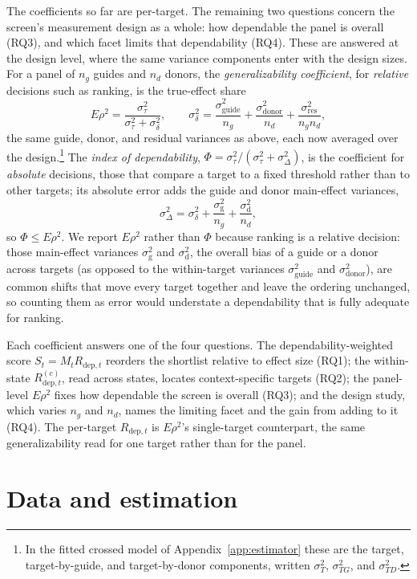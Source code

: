 \documentclass[11pt]{article}
\newcommand{\Rdep}{R_{\mathrm{dep},t}}
\begin{document}
The coefficients so far are per-target. The remaining two questions concern the
screen's measurement design as a whole: how dependable the panel is overall (RQ3),
and which facet limits that dependability (RQ4). These are answered at the design
level, where the same variance components enter with the design sizes. For a panel of
$n_g$ guides and $n_d$ donors, the \emph{generalizability coefficient}, for
\emph{relative} decisions such as ranking, is the true-effect share
\[
E\rho^2 = \frac{\sigma^2_\tau}{\sigma^2_\tau + \sigma^2_\delta}, \qquad
\sigma^2_\delta = \frac{\sigma^2_{\mathrm{guide}}}{n_g}
      + \frac{\sigma^2_{\mathrm{donor}}}{n_d} + \frac{\sigma^2_{\mathrm{res}}}{n_g n_d},
\]
the same guide, donor, and residual variances as above, each now averaged over the
design.\footnote{In the fitted crossed model of Appendix~\ref{app:estimator} these are
the target, target-by-guide, and target-by-donor components, written $\sigma^2_T$,
$\sigma^2_{TG}$, and $\sigma^2_{TD}$.} The \emph{index of dependability},
$\Phi = \sigma^2_\tau/(\sigma^2_\tau + \sigma^2_\Delta)$, is the coefficient for
\emph{absolute} decisions, those that compare a target to a fixed threshold rather than
to other targets; its absolute error adds the guide and donor main-effect variances,
\[
\sigma^2_\Delta = \sigma^2_\delta + \frac{\sigma^2_{\mathrm{g}}}{n_g}
      + \frac{\sigma^2_{\mathrm{d}}}{n_d},
\]
so $\Phi \le E\rho^2$. We report $E\rho^2$ rather than $\Phi$ because ranking is a
relative decision: those main-effect variances $\sigma^2_{\mathrm{g}}$ and
$\sigma^2_{\mathrm{d}}$, the overall bias of a guide or a donor across targets (as
opposed to the within-target variances $\sigma^2_{\mathrm{guide}}$ and
$\sigma^2_{\mathrm{donor}}$), are common shifts that move every target together and
leave the ordering unchanged, so counting them as error would understate a
dependability that is fully adequate for ranking.

Each coefficient answers one of the four questions. The dependability-weighted score
$S_t = M_t \Rdep$ reorders the shortlist relative to effect size (RQ1); the within-state
$\Rdep^{(c)}$, read across states, locates context-specific targets (RQ2); the
panel-level $E\rho^2$ fixes how dependable the screen is overall (RQ3); and the design
study, which varies $n_g$ and $n_d$, names the limiting facet and the gain from adding
to it (RQ4). The per-target $\Rdep$ is $E\rho^2$'s single-target counterpart, the same
generalizability read for one target rather than for the panel.

\section{Data and estimation}
\end{document}
